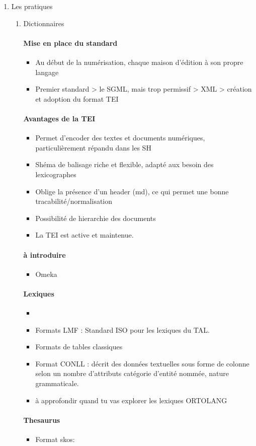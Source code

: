 \documentclass{book}
\newenvironment{titlemize}[1]{%
  \paragraph{#1}
  \begin{itemize}}
  {\end{itemize}}
\begin{document}
\begin{enumerate}
    \item Les pratiques
        \begin{enumerate} 
        	\item Dictionnaires
                \begin{titlemize}{Mise en place du standard}
                     \item Au début de la numérisation, chaque maison d'édition à son propre langage
                     \item Premier standard > le SGML, mais trop permissif > XML >  création et adoption du format TEI
                \end{titlemize}
                \begin{titlemize}{Avantages de la TEI}
                     \item Permet d'encoder des textes et documents numériques, particulièrement répandu dans les SH
                     \item Shéma de balisage riche et flexible, adapté aux besoin des lexicographes
                     \item Oblige la présence d'un header (md), ce qui permet une bonne tracabilité/normalisation 
                     \item Possibilité de hierarchie des documents
                     \item La TEI est active et maintenue.
                \end{titlemize}
                \begin{titlemize}{à introduire}
                    \item Omeka
                \end{titlemize}
        \begin{titlemize}{Lexiques}
            \item 
            \item Formats LMF : Standard ISO pour les lexiques du TAL.
            \item Formats de tables classiques
            \item Format CONLL : décrit des données textuelles sous forme de colonne selon un nombre d'attributs catégorie d'entité nommée, nature grammaticale.
            \item à approfondir quand tu vas explorer les lexiques ORTOLANG
        \end{titlemize}
        \begin{titlemize}{Thesaurus} 
            \item Format skos:

\end{titlemize}
\end{enumerate}
\end{enumerate}
\end{document}

